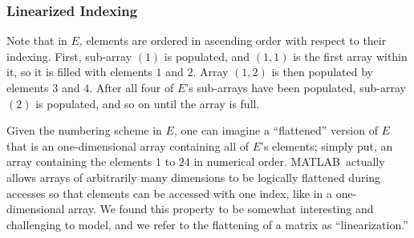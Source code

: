 \documentclass[11pt,conference]{IEEEtran}
\newcommand{\matlab}{MATLAB}
\theoremstyle{plain} %
\theoremstyle{definition}
\theoremstyle{remark}
\begin{document}
\begin{center}
\end{center}


\subsubsection{Linearized Indexing}\label{S:linearized_indexing}

Note that in \(E\), elements are ordered in ascending order with respect to
their indexing. First, sub-array \((1)\) is populated, and \((1, 1)\) is the
first array within it, so it is filled with elements \(1\) and \(2\). Array
\((1, 2)\) is then populated by elements \(3\) and \(4\). After all four of
\(E\)'s sub-arrays have been populated, sub-array \((2)\) is populated, and so
on until the array is full.

Given the numbering scheme in \(E\), one can imagine a ``flattened'' version of
\(E\) that is an one-dimensional array containing all of \(E\)'s elements;
simply put, an array containing the elements \(1\) to \(24\) in numerical
order. \matlab\ actually allows arrays of arbitrarily many dimensions to be
logically flattened during accesses so that elements can be accessed with one
index, like in a one-dimensional array. We found this property to be somewhat
interesting and challenging to model, and we refer to the flattening of a matrix
as ``linearization.''
\end{document}

